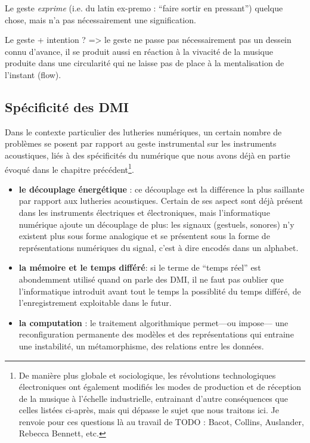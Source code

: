 Le geste \textit{exprime} (i.e. du latin ex-premo : ``faire sortir en pressant'') quelque chose, mais n'a pas nécessairement une signification.


Le geste + intention ? => le geste ne passe pas nécessairement pas un dessein connu d'avance, il se produit aussi en réaction à la vivacité de la musique produite dans une circularité qui ne laisse pas de place à la mentalisation de l'instant (flow).

\subsection{Spécificité des DMI}
Dans le contexte particulier des lutheries numériques, un certain nombre de problèmes se posent par rapport au geste instrumental sur les instruments acoustiques, liés à des spécificités du numérique que nous avons déjà en partie évoqué dans le chapitre précédent\footnote{De manière plus globale et sociologique, les révolutions technologiques électroniques ont également modifiés les modes de production et de réception de la musique à l'échelle industrielle, entrainant d'autre conséquences que celles listées ci-après, mais qui dépasse le sujet que nous traitons ici. Je renvoie pour ces questions là au travail de TODO : Bacot, Collins, Auslander, Rebecca Bennett, etc.}.

\vspace{-1em}
\begin{itemize}[noitemsep]
\item \textbf{le découplage énergétique} : ce découplage est la différence la plus saillante par rapport aux lutheries acoustiques. Certain de ses aspect sont déjà présent dans les instruments électriques et électroniques, mais l'informatique numérique ajoute un découplage de plus: les signaux (gestuels, sonores) n'y existent plus sous forme analogique et se présentent sous la forme de représentations numériques du signal, c'est à dire encodés dans un alphabet.
\item \textbf{la mémoire et le temps différé}: si le terme de ``temps réel'' est abondemment utilisé quand on parle des DMI, il ne faut pas oublier que l'informatique introduit avant tout le temps la possiblité du temps différé, de l'enregistrement exploitable dans le futur.
\item \textbf{la computation} : le traitement algorithmique permet—ou impose— une reconfiguration permanente des modèles et des représentations qui entraine une instabilité, un métamorphisme, des relations entre les données.
\end{itemize}




